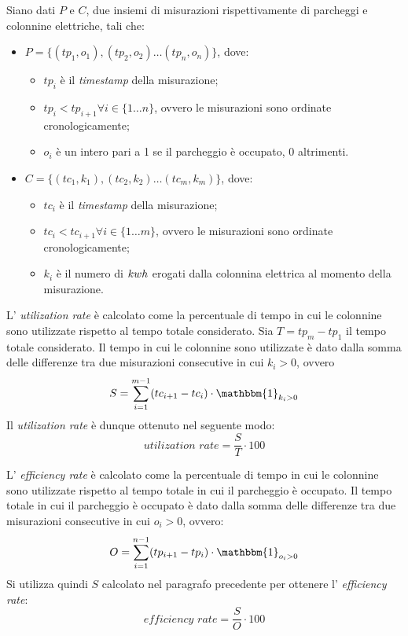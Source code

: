 Siano dati $P$ e $C$, due insiemi di misurazioni rispettivamente di parcheggi e colonnine elettriche, tali che:
\begin{itemize}
	\item $P = \{(tp_1, o_1), (tp_2, o_2)\ldots (tp_n, o_n)\}$, dove:
	      \begin{itemize}
		      \item $tp_i$ è il \textit{timestamp} della misurazione;
		      \item $tp_i < tp_{i+1}\forall i\in\{1\ldots n\}$, ovvero le misurazioni sono ordinate cronologicamente;
		      \item $o_i$ è un intero pari a 1 se il parcheggio è occupato, 0 altrimenti.
	      \end{itemize}
	\item $C = \{(tc_1, k_1), (tc_2, k_2)\ldots (tc_m, k_m)\}$, dove:
	      \begin{itemize}
		      \item $tc_i$ è il \textit{timestamp} della misurazione;
		      \item $tc_i < tc_{i+1}\forall i\in\{1\ldots m\}$, ovvero le misurazioni sono ordinate cronologicamente;
		      \item $k_i$ è il numero di ${kwh}$ erogati dalla colonnina elettrica al momento della misurazione.
	      \end{itemize}
\end{itemize}

L' \textit{utilization rate} è calcolato come la percentuale di tempo in cui le colonnine sono utilizzate rispetto al tempo totale considerato.
Sia $T = tp_m - tp_1$ il tempo totale considerato. Il tempo in cui le colonnine sono utilizzate è dato dalla somma delle differenze tra due misurazioni consecutive
in cui $k_i > 0$, ovvero
\[
	S = \sum_{i=1}^{m-1} (tc_{i+1} - tc_i) \cdot \mathbbm{1}_{k_i > 0}
\]
Il \textit{utilization rate} è dunque ottenuto nel seguente modo:
\[
	\textit{utilization rate} = \frac{S}{T} \cdot 100
\]

L' \textit{efficiency rate} è calcolato come la percentuale di tempo in cui le colonnine sono utilizzate rispetto al tempo totale in cui il parcheggio è occupato.
Il tempo totale in cui il parcheggio è occupato è dato dalla somma delle differenze tra due misurazioni consecutive in cui $o_i > 0$, ovvero:
\[
	O = \sum_{i=1}^{n-1} (tp_{i+1} - tp_i) \cdot \mathbbm{1}_{o_i > 0}
\]
Si utilizza quindi $S$ calcolato nel paragrafo precedente per ottenere l' \textit{efficiency rate}:
\[
	\textit{efficiency rate} = \frac{S}{O} \cdot 100
\]


